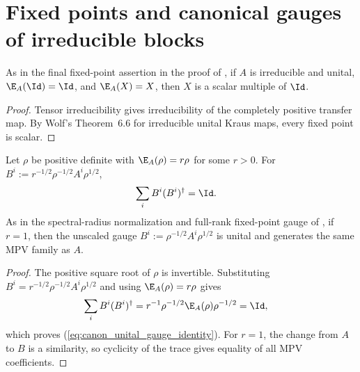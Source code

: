 \section{Fixed points and canonical gauges of irreducible blocks}

\begin{lemma}%
    \label{thm:irreducible_unital_scalar_fixed_point}
    \leanok
    As in the final fixed-point assertion in the proof of
    \cite[Theorem~4]{PerezGarcia2007Matrix}, if $A$ is irreducible and unital,
    $\E_A(\Id)=\Id$, and $\E_A(X)=X$, then $X$ is a scalar multiple of $\Id$.
\end{lemma}

\begin{proof}\leanok
    Tensor irreducibility gives irreducibility of the completely positive
    transfer map. By Wolf's Theorem~6.6 for irreducible unital Kraus maps, every
    fixed point is scalar.
\end{proof}

\begin{lemma}%
    \label{thm:unital_gauge_of_pd_fixed_point}
    \leanok
    Let $\rho$ be positive definite with $\E_A(\rho)=r\rho$ for some $r>0$.
    For $B^i:=r^{-1/2}\rho^{-1/2}A^i\rho^{1/2}$,
    \begin{align}
        \sum_i B^i(B^i)^\dagger
         & =\Id.
        \label{eq:canon_unital_gauge_identity}
    \end{align}
    As in the spectral-radius normalization and full-rank fixed-point gauge of
    \cite[Theorem~4]{PerezGarcia2007Matrix}, if $r=1$, then the unscaled gauge
    $B^i:=\rho^{-1/2}A^i\rho^{1/2}$ is unital and generates the same MPV
    family as $A$.
\end{lemma}

\begin{proof}\leanok
    The positive square root of $\rho$ is invertible. Substituting
    $B^i=r^{-1/2}\rho^{-1/2}A^i\rho^{1/2}$ and using
    $\E_A(\rho)=r\rho$ gives
    \begin{align}
        \sum_i B^i(B^i)^\dagger
         & =r^{-1}\rho^{-1/2}\E_A(\rho)\rho^{-1/2}
        =\Id,
        \notag
    \end{align}
    which proves (\ref{eq:canon_unital_gauge_identity}). For $r=1$, the change
    from $A$ to $B$ is a similarity, so cyclicity of the trace gives equality
    of all MPV coefficients.
\end{proof}


